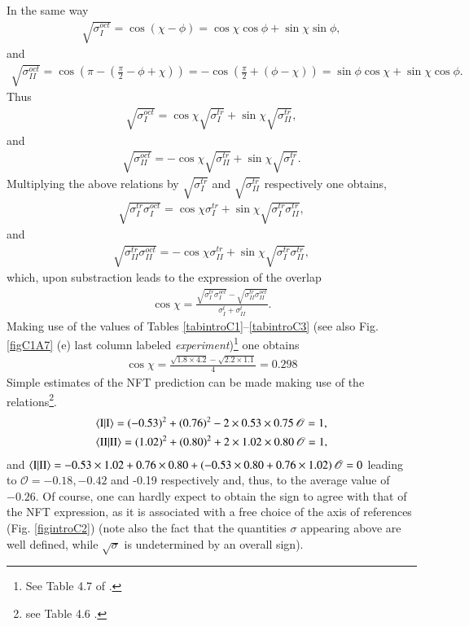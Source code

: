 In the same way
\begin{align}
\sqrt{\sigma^{oct}_I}=\cos(\chi-\phi)=\cos\chi\cos\phi+\sin\chi\sin\phi,
\end{align}
and
\begin{align}
\sqrt{\sigma^{oct}_{II}}=\cos\left(\pi-\left(\frac{\pi}{2}-\phi+\chi\right)\right)=-\cos\left(\frac{\pi}{2}+(\phi-\chi)\right)=\sin\phi\cos\chi+\sin\chi\cos\phi.
\end{align}
Thus
\begin{align}
\sqrt{\sigma^{oct}_{I}}=\cos\chi\sqrt{\sigma^{tr}_{I}}+\sin\chi\sqrt{\sigma^{tr}_{II}},
\end{align}
and
\begin{align}
\sqrt{\sigma^{oct}_{II}}=-\cos\chi\sqrt{\sigma^{tr}_{II}}+\sin\chi\sqrt{\sigma^{tr}_{I}}.
\end{align}
Multiplying the above relations by $\sqrt{\sigma^{tr}_{I}}$ and $\sqrt{\sigma^{tr}_{II}}$ respectively one obtains,
\begin{align}
\sqrt{\sigma^{tr}_{I}\sigma^{oct}_{I}}=\cos\chi\sigma^{tr}_I+\sin\chi\sqrt{\sigma^{tr}_{I}\sigma^{tr}_{II}},
\end{align}
and
\begin{align}
\sqrt{\sigma^{tr}_{II}\sigma^{oct}_{II}}=-\cos\chi\sigma^{tr}_{II}+\sin\chi\sqrt{\sigma^{tr}_{I}\sigma^{tr}_{II}},
\end{align}
which, upon substraction  leads to the  expression of the overlap
\begin{align}
\cos\chi=\frac{\sqrt{\sigma^{tr}_{I}\sigma^{oct}_{I}}-\sqrt{\sigma^{tr}_{II}\sigma^{oct}_{II}}}{\sigma_I^t+\sigma_{II}^t}.
\end{align}
Making use of the values of Tables \ref{tabintroC1}--\ref{tabintroC3} (see also Fig. \ref{figC1A7} (e) last column labeled \textit{experiment})\footnote{See Table 4.7 of \cite{Bortignon:77}.} one obtains
\begin{align}
\cos\chi=\frac{\sqrt{1.8\times4.2}-\sqrt{2.2\times1.1}}{4}=0.298
\end{align}
  Simple estimates of the NFT prediction can be made making use of the relations\footnote{see Table 4.6 \cite{Bortignon:77}.}.
\begin{align}
\nonumber &\langle {\text{I}|\text{I}} \rangle= (-0.53)^2+(0.76)^2-2\times0.53\times0.75\, \mathscr O=1,\\
\nonumber &\langle {\text{II}|\text{II}} \rangle= (1.02)^2+(0.80)^2+2\times1.02\times0.80\, \mathscr O=1,
\end{align}
and $\langle {\text{I}|\text{II}} \rangle=-0.53\times1.02+0.76\times0.80+(-0.53\times0.80+0.76\times1.02)\,\mathscr O=0$ leading to $\mathscr O=-0.18, -0.42$ and -0.19 respectively and, thus, to the average value of \mbox{$-0.26$}.
 Of course, one can hardly expect to obtain the sign to agree with that of the NFT expression, as it is associated with a free choice of the axis of references (Fig. \ref{figintroC2}) (note also the fact that the quantities $\sigma$ appearing above are well defined, while $\sqrt{\sigma}$ is undetermined by an overall sign).
